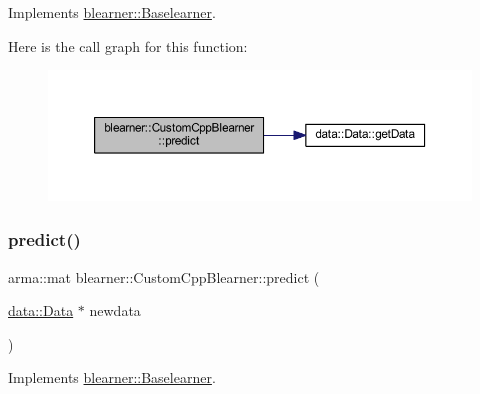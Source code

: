 Implements \mbox{\hyperlink{classblearner_1_1_baselearner_ab37986047db43c84420fef2cef7fc20d}{blearner\+::\+Baselearner}}.

Here is the call graph for this function\+:
\nopagebreak
\begin{figure}[H]
\begin{center}
\leavevmode
\includegraphics[width=350pt]{classblearner_1_1_custom_cpp_blearner_aa17db5f5627b8251b2d8484d92e783b9_cgraph}
\end{center}
\end{figure}
\mbox{\label{classblearner_1_1_custom_cpp_blearner_af2326171640e94c3a00f813781710208}} 
\subsubsection{\texorpdfstring{predict()}{predict()}\hspace{0.1cm}{\footnotesize\ttfamily [2/2]}}
{\footnotesize\ttfamily arma\+::mat blearner\+::\+Custom\+Cpp\+Blearner\+::predict (\begin{DoxyParamCaption}\item[{\mbox{\hyperlink{classdata_1_1_data}{data\+::\+Data}} $\ast$}]{newdata }\end{DoxyParamCaption})\hspace{0.3cm}{\ttfamily [virtual]}}



Implements \mbox{\hyperlink{classblearner_1_1_baselearner_ae2ef5e018783578e02b3b5a33fa94eae}{blearner\+::\+Baselearner}}.

